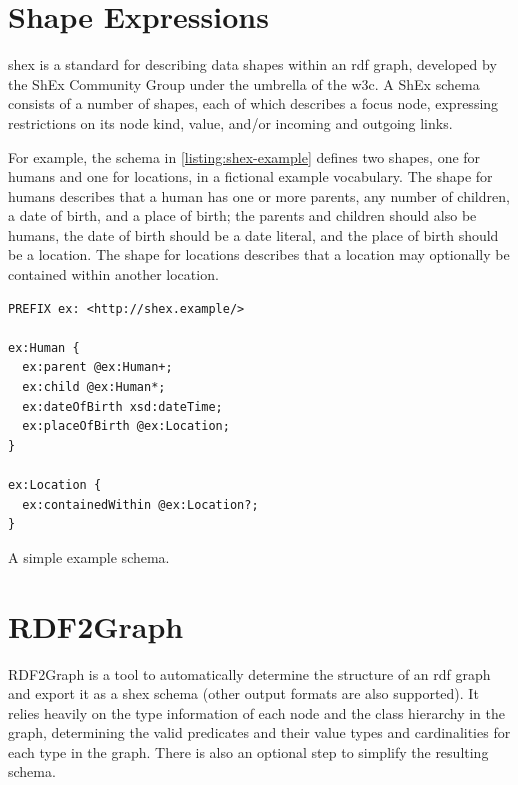 
\section{Shape Expressions}
\label{sec:Background:ShEx}

\acrfull{shex} \cite{shex}
is a standard for describing data shapes within an \gls{rdf} graph,
developed by the ShEx Community Group under the umbrella of the \gls{w3c}.
A ShEx schema consists of a number of shapes,
each of which describes a focus node,
expressing restrictions on its node kind, value, and/or incoming and outgoing links.

For example, the schema in \cref{listing:shex-example} defines two shapes,
one for humans and one for locations,
in a fictional example vocabulary.
The shape for humans describes that a human has one or more parents,
any number of children,
a date of birth,
and a place of birth;
the parents and children should also be humans,
the date of birth should be a date literal,
and the place of birth should be a location.
The shape for locations describes that a location may optionally be contained within another location.

\begin{lstfloat}
\begin{lstlisting}[language=sparql]
PREFIX ex: <http://shex.example/>

ex:Human {
  ex:parent @ex:Human+;
  ex:child @ex:Human*;
  ex:dateOfBirth xsd:dateTime;
  ex:placeOfBirth @ex:Location;
}

ex:Location {
  ex:containedWithin @ex:Location?;
}
\end{lstlisting}
\caption{A simple example schema.}
\label{listing:shex-example}
\end{lstfloat}


\section{RDF2Graph}
\label{sec:Background:RDF2Graph}


RDF2Graph %
\cite{vanDam2015}
is a tool to automatically determine the structure of an \gls{rdf} graph
and export it as a \gls{shex} schema
(other output formats are also supported).
It relies heavily on the type information of each node and the class hierarchy in the graph,
determining the valid predicates and their value types and cardinalities for each type in the graph.
There is also an optional step to simplify the resulting schema.

